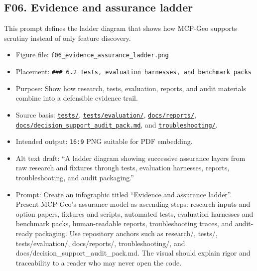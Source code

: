 \subsection{F06. Evidence and assurance
ladder}\label{f06.-evidence-and-assurance-ladder}

This prompt defines the ladder diagram that shows how MCP-Geo supports
scrutiny instead of only feature discovery.

\begin{itemize}
\tightlist
\item
  Figure file: \texttt{f06\_evidence\_assurance\_ladder.png}
\item
  Placement:
  \texttt{\#\#\#\ 6.2\ Tests,\ evaluation\ harnesses,\ and\ benchmark\ packs}
\item
  Purpose: Show how research, tests, evaluation, reports, and audit
  materials combine into a defensible evidence trail.
\item
  Source basis:
  \href{https://github.com/chris-page-gov/mcp-geo/tree/fe862910da246ca77f374cfbe484985f5df4d316/tests}{\texttt{tests/}},
  \href{https://github.com/chris-page-gov/mcp-geo/tree/fe862910da246ca77f374cfbe484985f5df4d316/tests/evaluation}{\texttt{tests/evaluation/}},
  \href{https://github.com/chris-page-gov/mcp-geo/tree/fe862910da246ca77f374cfbe484985f5df4d316/docs/reports}{\texttt{docs/reports/}},
  \href{https://github.com/chris-page-gov/mcp-geo/blob/fe862910da246ca77f374cfbe484985f5df4d316/docs/decision_support_audit_pack.md}{\texttt{docs/decision\_support\_audit\_pack.md}},
  and
  \href{https://github.com/chris-page-gov/mcp-geo/tree/fe862910da246ca77f374cfbe484985f5df4d316/troubleshooting}{\texttt{troubleshooting/}}.
\item
  Intended output: \texttt{16:9} PNG suitable for PDF embedding.
\item
  Alt text draft: ``A ladder diagram showing successive assurance layers
  from raw research and fixtures through tests, evaluation harnesses,
  reports, troubleshooting, and audit packaging.''
\item
  Prompt: Create an infographic titled ``Evidence and assurance
  ladder''. Present MCP-Geo's assurance model as ascending steps:
  research inputs and option papers, fixtures and scripts, automated
  tests, evaluation harnesses and benchmark packs, human-readable
  reports, troubleshooting traces, and audit-ready packaging. Use
  repository anchors such as research/, tests/, tests/evaluation/,
  docs/reports/, troubleshooting/, and
  docs/decision\_support\_audit\_pack.md. The visual should explain
  rigor and traceability to a reader who may never open the code.
\end{itemize}


